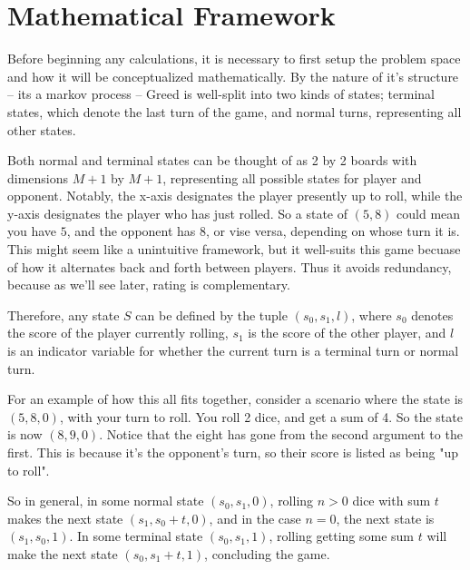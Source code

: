 \documentclass[a4paper]{article}
\begin{document}

\section{Mathematical Framework}

Before beginning any calculations, it is necessary to first setup the problem space and how it will be conceptualized mathematically. By the nature of it's structure -- its a markov process -- Greed is well-split into two kinds of states; terminal states, which denote the last turn of the game, and normal turns, representing all other states. 

Both normal and terminal states can be thought of as 2 by 2 boards with dimensions $M+1$ by $M+1$, representing all possible states for player and opponent. Notably, the x-axis designates the player presently up to roll, while the y-axis designates the player who has just rolled. So a state of $(5, 8)$ could mean you have $5$, and the opponent has $8$, or vise versa, depending on whose turn it is. This might seem like a unintuitive framework, but it well-suits this game becuase of how it alternates back and forth between players. Thus it avoids redundancy, because as we'll see later, rating is complementary.

Therefore, any state $S$ can be defined by the tuple $(s_0, s_1, l)$, where $s_0$ denotes the score of the player currently rolling, $s_1$ is the score of the other player, and $l$ is an indicator variable for whether the current turn is a terminal turn or normal turn.

For an example of how this all fits together, consider a scenario where the state is $(5, 8, 0)$, with your turn to roll. You roll 2 dice, and get a sum of 4. So the state is now $(8, 9, 0)$. Notice that the eight has gone from the second argument to the first. This is because it's the opponent's turn, so their score is listed as being "up to roll". 

So in general, in some normal state $(s_0, s_1, 0)$, rolling $n > 0$ dice with sum $t$ makes the next state $(s_1, s_0 + t, 0)$, and in the case $n = 0$, the next state is $(s_1, s_0, 1)$. In some terminal state $(s_0, s_1, 1)$, rolling getting some sum $t$ will make the next state $(s_0, s_1 + t, 1)$, concluding the game.

\end{document}
